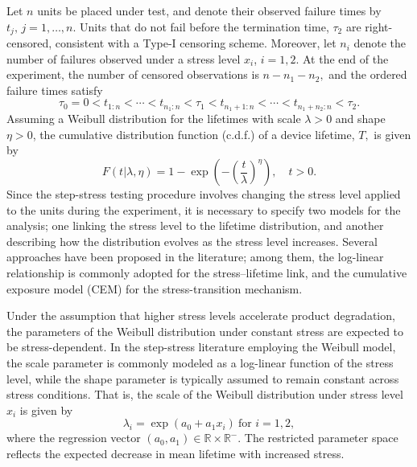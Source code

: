 \documentclass{article}
\begin{document}
Let $n$ units be placed under test, and denote their observed failure times by $ t_j, \, j=1,\ldots,n $.  Units that do not fail before the termination time, $\tau_2$ are right-censored, consistent with a Type-I censoring scheme.
Moreover,  let $ n_i $ denote the number of failures observed under a stress level $ x_i $, $ i=1,2 $. At the end of the experiment, the number of censored observations is  
$
n - n_1 - n_2,
$
and the ordered failure times satisfy  
\begin{equation}
\tau_0 = 0 < t_{1:n} < \cdots < t_{n_1:n} < \tau_1 < t_{n_1+1:n} < \cdots < t_{n_1+n_2:n} < \tau_2.
\label{eq:order}
\end{equation}
Assuming a Weibull distribution for the lifetimes with scale $\lambda > 0$ and shape $\eta >0$, the cumulative distribution function (c.d.f.) of a device lifetime, $T,$ is given by
\begin{equation}
	F(t|\lambda,\eta)=1-\exp\left(-\left(\frac{t}{\lambda}\right)^{\eta}\right)  , \quad t>0. \nonumber
\end{equation}
Since the step-stress testing procedure involves changing the stress level applied to the units during the experiment, it is necessary to specify two models for the analysis; one linking the stress level to the lifetime distribution, and another describing how the distribution evolves as the stress level increases. Several approaches have been proposed in the literature; among them, the log-linear relationship is commonly adopted for the stress–lifetime link, and the cumulative exposure model (CEM) for the stress-transition mechanism.

Under the assumption that higher stress levels accelerate product degradation, the parameters of the Weibull distribution under constant stress are expected to be stress-dependent. In the step-stress literature employing the Weibull model, the scale parameter is commonly modeled as a log-linear function of the stress level, while the shape parameter is typically assumed to remain constant across stress conditions.
 That is, the scale of the Weibull distribution under stress level $x_i$ is given by
\begin{equation}
	\lambda_i = \exp(a_0 + a_1 x_i)\ \text{for } i=1, 2,
	\label{eq:funcrelation}
\end{equation}
where the regression vector $(a_0, a_1) \in \mathbb{R} \times \mathbb{R}^{-}.$ The restricted  parameter space reflects the expected decrease in mean lifetime with increased stress.
\end{document}
